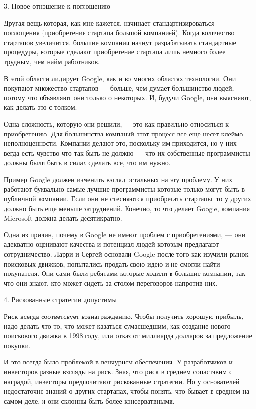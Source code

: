 \documentclass[ebook,12pt,oneside,openany]{memoir}
\begin{document}
3. Новое отношение к поглощению

Другая вещь которая, как мне кажется, начинает стандартизироваться —
поглощения (приобретение стартапа большой компанией). Когда количество
стартапов увеличится, большие компании начнут разрабатывать
стандартные процедуры, которые сделают приобретение стартапа лишь
немного более трудным, чем найм работников.

В этой области лидирует Google, как и во многих областях технологии.
Они покупают множество стартапов — больше, чем думает большинство
людей, потому что объявляют они только о некоторых. И, будучи Google,
они выясняют, как делать это с толком.

Одна сложность, которую они решили, — это как правильно относиться к
приобретению. Для большинства компаний этот процесс все еще несет
клеймо неполноценности. Компании делают это, поскольку им приходится,
но у них вегда есть чувство что так быть не должно — что их
собственные программисты должны были быть в силах сделать все, что им
нужно.

Пример Google должен изменить взгляд остальных на эту проблему. У них
работают буквально самые лучшие программисты которые только могут быть
в публичной компании. Если они не стесняются приобретать стартапы, то
у других должно быть еще меньше затруднений. Конечно, то что делает
Google, компания Microsoft должна делать десятикратно.

Одна из причин, почему в Google не имеют проблем с приобретениями, —
они адекватно оценивают качества и потенциал людей которым предлагают
сотрудничество. Ларри и Сергей основали Google после того как изучили
рынок поисковых движков, попытались продать свою идею и не смогли
найти покупателя. Они сами были ребятами которые ходили в большие
компании, так что они знают, кто может сидеть за столом переговоров
напротив них.

4. Рискованные стратегии допустимы

Риск всегда соответсвует вознаграждению. Чтобы получить хорошую
прибыль, надо делать что-то, что может казаться сумасшедшим, как
создание нового поискового движка в 1998 году, или отказ от миллиарда
долларов за предложение покупки.

И это всегда было проблемой в венчурном обеспечении. У разработчиков и
инвесторов разные взгляды на риск. Зная, что риск в среднем сопаставим
с наградой, инвесторы предпочитают рискованные стратегии. Но у
основателей недостаточно знаний о других стартапах, чтобы понять, что
бывает в среднем на самом деле, и они склонны быть более
консерватвными.
\end{document}
